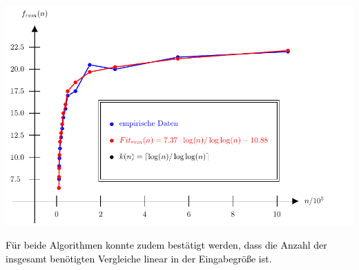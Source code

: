 \documentclass[a1,portrait]{a0poster}
\begin{document}
\begin{multicols}{2}
\begin{center}
    \includegraphics[scale=1.5]{pics/theo5_rem}
    \vspace*{-2cm}
\end{center}
\noindent
\textcolor{black}{
Für beide Algorithmen konnte zudem bestätigt werden, dass die Anzahl 
der insgesamt benötigten Vergleiche linear in der Eingabegröße ist.}



\end{multicols}
\end{document}
